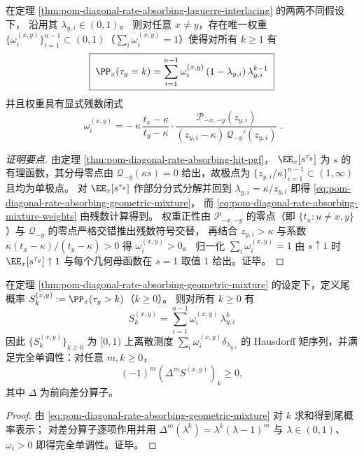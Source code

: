 \begin{theorem}\label{thm:pom-diagonal-rate-absorbing-geometric-mixture}
在定理 \ref{thm:pom-diagonal-rate-absorbing-laguerre-interlacing} 的两两不同假设下，
沿用其 \(\lambda_{y,i}\in(0,1)\)。
则对任意 \(x\ne y\)，存在唯一权重 \(\{\omega_i^{(x,y)}\}_{i=1}^{n-1}\subset(0,1)\)（\(\sum_i\omega_i^{(x,y)}=1\)）使得对所有 \(k\ge 1\) 有
\begin{equation}\label{eq:pom-diagonal-rate-absorbing-geometric-mixture}
\boxed{\;
\PP_x(\tau_y=k)
=\sum_{i=1}^{n-1}\omega_i^{(x,y)}\,(1-\lambda_{y,i})\,\lambda_{y,i}^{k-1}\;}
\end{equation}
并且权重具有显式残数闭式
\begin{equation}\label{eq:pom-diagonal-rate-absorbing-mixture-weights}
\boxed{\;
\omega_i^{(x,y)}
=
-\,\kappa\,\frac{t_x-\kappa}{t_y-\kappa}\cdot
\frac{\mathcal P_{-x,-y}(z_{y,i})}{(z_{y,i}-\kappa)\,\mathcal Q_{-y}'(z_{y,i})}\; } .
\end{equation}
\end{theorem}
\begin{proof}[证明要点]
由定理 \ref{thm:pom-diagonal-rate-absorbing-hit-pgf}，
\(
\EE_x[s^{\tau_y}]
\)
为 \(s\) 的有理函数，其分母零点由 \(\mathcal Q_{-y}(\kappa s)=0\) 给出，故极点为 \(\{z_{y,i}/\kappa\}_{i=1}^{n-1}\subset(1,\infty)\) 且均为单极点。
对 \(\EE_x[s^{\tau_y}]\) 作部分分式分解并回到 \(\lambda_{y,i}=\kappa/z_{y,i}\) 即得 \eqref{eq:pom-diagonal-rate-absorbing-geometric-mixture}，
而 \eqref{eq:pom-diagonal-rate-absorbing-mixture-weights} 由残数计算得到。
权重正性由 \(\mathcal P_{-x,-y}\) 的零点（即 \(\{t_u:u\ne x,y\}\)）与 \(\mathcal Q_{-y}\) 的零点严格交错推出残数符号交替，
再结合 \(z_{y,i}>\kappa\) 与系数 \(\kappa(t_x-\kappa)/(t_y-\kappa)>0\) 得 \(\omega_i^{(x,y)}>0\)。
归一化 \(\sum_i\omega_i^{(x,y)}=1\) 由 \(s\uparrow 1\) 时 \(\EE_x[s^{\tau_y}]\uparrow 1\) 与每个几何母函数在 \(s=1\) 取值 \(1\) 给出。证毕。
\end{proof}

\begin{corollary}\label{cor:pom-diagonal-rate-absorbing-hausdorff-moment-tail}
在定理 \ref{thm:pom-diagonal-rate-absorbing-geometric-mixture} 的设定下，定义尾概率
\(
S_k^{(x,y)}:=\PP_x(\tau_y>k)
\)（\(k\ge 0\)）。
则对所有 \(k\ge 0\) 有
\[
\boxed{\;
S_k^{(x,y)}=\sum_{i=1}^{n-1}\omega_i^{(x,y)}\,\lambda_{y,i}^{k}\;}
\]
因此 \(\{S_k^{(x,y)}\}_{k\ge 0}\) 为 \([0,1)\) 上离散测度 \(\sum_i\omega_i^{(x,y)}\delta_{\lambda_{y,i}}\) 的 Hausdorff 矩序列，并满足完全单调性：对任意 \(m,k\ge 0\)，
\[
(-1)^m(\Delta^m S^{(x,y)})_k\ge 0,
\]
其中 \(\Delta\) 为前向差分算子。
\end{corollary}
\begin{proof}
由 \eqref{eq:pom-diagonal-rate-absorbing-geometric-mixture} 对 \(k\) 求和得到尾概率表示；
对差分算子逐项作用并用
\(
\Delta^m(\lambda^k)=\lambda^k(\lambda-1)^m
\)
与 \(\lambda\in(0,1)\)、\(\omega_i>0\) 即得完全单调性。证毕。
\end{proof}

